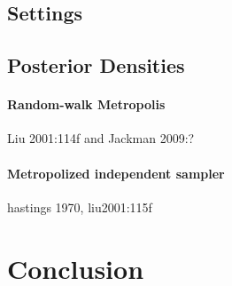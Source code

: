 \documentclass[11pt]{article}
\begin{document}
\subsection{Settings}

\subsection{Posterior Densities}





\paragraph{Random-walk Metropolis}
Liu 2001:114f and Jackman 2009:?

\paragraph{Metropolized independent sampler}
hastings 1970,
liu2001:115f











\section{Conclusion}\label{sec:conclusion}

\printbibliography[heading=bibintoc]\nocite{*}
\end{document}
